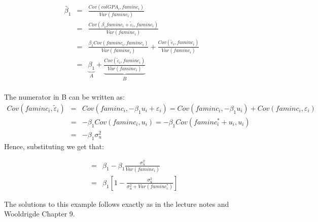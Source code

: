 \documentclass[12pt, oneside]{article}   	%
\begin{document}
\begin{eqnarray*}
     \tilde{\beta_1} &=&  \frac{Cov \left(colGPA_i, faminc_{i}\right)}{Var\left(faminc_{i}\right)}  \\
      &=&  \frac{Cov \left( \beta_1 faminc_{i} +\tilde{ \varepsilon}_{i} , faminc_{i} \right)}{Var\left(faminc_{i}\right)} \\
             &=& \frac{\beta_1 Cov \left(  faminc_{i} , faminc_{i} \right)}{Var\left(faminc_{i}\right)}+\frac{Cov \left(   \tilde{ \varepsilon}_{i}, faminc_{i} \right)}{Var\left(faminc_{i}\right)} \\
      &=&  \underbrace{ \beta_1}_{A} +   \underbrace{\frac{Cov \left( \tilde{ \varepsilon}_{i} ,faminc_{i} \right)}{Var\left(faminc_{i}\right)} }_{B} \\
\end{eqnarray*}


The numerator in B can be written as:
  \begin{eqnarray*}
	Cov \left(faminc_{i},\tilde{ \varepsilon}_{i} \right) &=& Cov\left(faminc_{i},  - \beta_1 u_{i} + \varepsilon_{i}\right)=Cov\left(faminc_{i}, -\beta_1 u_{i}\right)+ Cov\left(faminc_{i},  \varepsilon_{i} \right) \\
	                                    &=& -\beta_1 Cov\left(faminc_{i},u_{i}\right) = -\beta_1 Cov\left(faminc^{*}_{i}+u_{i}, u_{i}\right)\\
	                                    &=&  -\beta_1 \sigma^{2}_{u}
 \end{eqnarray*}
Hence, substituting we get that:

\begin{eqnarray*}
    &=&  \beta_1 - \beta_1 \frac{\sigma^{2}_{u}}{Var\left(faminc_{i}\right)}\\
        &=&  \beta_1 \left[1 -  \frac{\sigma^{2}_{u}}{\sigma^{2}_{u}+Var\left(faminc^{*}_{i}\right)}\right]
\end{eqnarray*}

The solutions to this example follows exactly as in the lecture notes and Wooldrigde Chapter 9.
\end{document}

